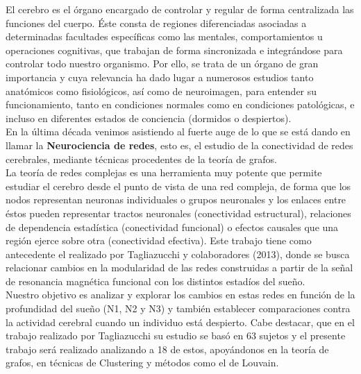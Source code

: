 
El cerebro es el órgano encargado de controlar y regular de forma centralizada las funciones del cuerpo. Éste consta de regiones diferenciadas asociadas a determinadas facultades específicas como las mentales, comportamientos u operaciones cognitivas, que trabajan de forma sincronizada e integrándose para controlar todo nuestro organismo. Por ello, se trata de un órgano de gran importancia y cuya relevancia ha dado lugar a numerosos estudios tanto anatómicos como fisiológicos, así como de neuroimagen, para entender su funcionamiento, tanto en condiciones normales como en condiciones patológicas, e incluso en diferentes estados de conciencia (dormidos o despiertos).\\
En la última década venimos asistiendo al fuerte auge de lo que se está dando en llamar la \textbf{Neurociencia de redes}, esto es, el estudio de la conectividad de redes cerebrales, mediante técnicas procedentes de la teoría de grafos.\\
La teoría de redes complejas es una herramienta muy potente que permite estudiar el cerebro desde el punto de vista de una red compleja, de forma que los nodos representan neuronas individuales o grupos neuronales y los enlaces entre éstos pueden representar tractos neuronales (conectividad estructural), relaciones de dependencia estadística (conectividad funcional) o efectos causales que una región ejerce sobre otra (conectividad efectiva).
Este trabajo tiene como antecedente el realizado por Tagliazucchi y colaboradores (2013), donde se busca relacionar cambios en la modularidad de las redes construidas a partir de la señal de resonancia magnética funcional con los distintos estadíos del sueño. \\
Nuestro objetivo es analizar y explorar los cambios en estas redes en función de la profundidad del sueño (N1, N2 y N3) y también establecer comparaciones contra la actividad cerebral cuando un individuo está despierto. Cabe destacar, que en el trabajo realizado por Tagliazucchi su estudio se basó en 63 sujetos y el presente trabajo será realizado analizando a 18 de estos, apoyándonos en la teoría de grafos, en técnicas de Clustering y métodos como el de Louvain. 